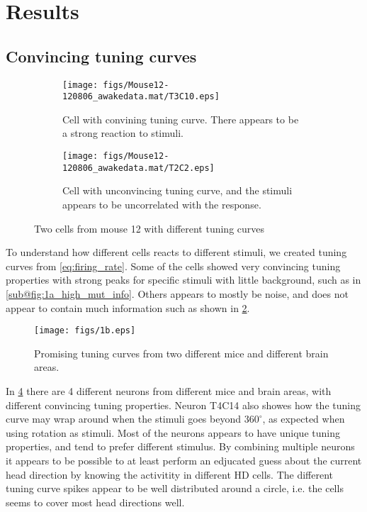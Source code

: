 \section{Results}

\subsection{Convincing tuning curves}
\begin{figure}
    \centering
    \begin{subfigure}[b]{0.4\textwidth}
        \texttt{[image: figs/Mouse12-120806\_awakedata.mat/T3C10.eps]}
        \caption{Cell with convining tuning curve. There appears to be a strong reaction to stimuli.}
        \label{fig:1a_high_mut_info}
    \end{subfigure}
    \begin{subfigure}[b]{0.4\textwidth}
        \texttt{[image: figs/Mouse12-120806\_awakedata.mat/T2C2.eps]}
        \caption{Cell with unconvincing tuning curve, and the stimuli appears to be uncorrelated with the response.}
        \label{fig:1a_low_mut_info}
    \end{subfigure}
    \caption{Two cells from mouse 12 with different tuning curves}
    \label{fig:1a_two_tuning_curves}
\end{figure}
To understand how different cells reacts to different stimuli, we created tuning curves from \cref{eq:firing_rate}. Some of the cells showed very convincing tuning properties with strong peaks for specific stimuli with little background, such as in \cref{sub@fig:1a_high_mut_info}. Others appears to mostly be noise, and does not appear to contain much information such as shown in \cref{fig:1a_low_mut_info}. 
\begin{figure}[H]
    \centering
    \texttt{[image: figs/1b.eps]}
    \caption{Promising tuning curves from two different mice and different brain areas. }
    \label{fig:1b_convincing_tuning}
\end{figure} 
In \cref{fig:1b_convincing_tuning} there are 4 different neurons from different mice and brain areas, with different convincing tuning properties. Neuron T4C14 also showes how the tuning curve may wrap around when the stimuli goes beyond $360^\circ$, as expected when using rotation as stimuli. Most of the neurons appears to have unique tuning properties, and tend to prefer different stimulus. By combining multiple neurons it appears to be possible to at least perform an edjucated guess about the current head direction by knowing the activitity in different HD cells. The different tuning curve spikes appear to be well distributed around a circle, i.e. the cells seems to cover most head directions well. 
